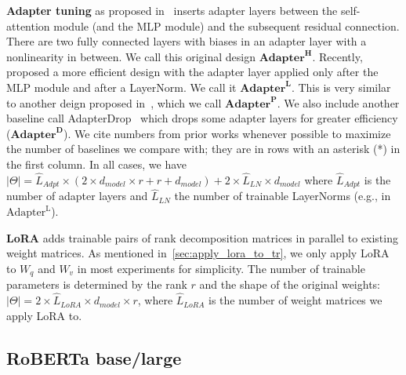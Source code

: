 \textbf{Adapter tuning} as proposed in~\citet{houlsby_parameter-efficient_2019} inserts adapter layers between the self-attention module (and the MLP module) and the subsequent residual connection. There are two fully connected layers with biases in an adapter layer with a nonlinearity in between. We call this original design $\textbf{Adapter}^{\textbf{H}}$.
Recently, \citet{lin-etal-2020-exploring} proposed a more efficient design with the adapter layer applied only after the MLP module and after a LayerNorm. We call it $\textbf{Adapter}^{\textbf{L}}$.
This is very similar to another deign proposed in~\citet{pfeiffer2021adapterfusion}, which we call $\textbf{Adapter}^{\textbf{P}}$.
We also include another baseline call AdapterDrop~\citep{ruckle2020adapterdrop} which drops some adapter layers for greater efficiency ($\textbf{Adapter}^{\textbf{D}}$).
We cite numbers from prior works whenever possible to maximize the number of baselines we compare with; they are in rows with an asterisk (*) in the first column. In all cases,  we have $|\Theta| = \hat{L}_{Adpt} \times (2 \times d_{model} \times r + r + d_{model}) + 2 \times \hat{L}_{LN} \times d_{model}$ where $\hat{L}_{Adpt}$ is the number of adapter layers and $\hat{L}_{LN}$ the number of trainable LayerNorms (e.g., in $\text{Adapter}^{\text{L}}$).

\textbf{LoRA} adds trainable pairs of rank decomposition matrices in parallel to existing weight matrices. As mentioned in~\autoref{sec:apply_lora_to_tr}, we only apply LoRA to $W_{q}$ and $W_{v}$ in most experiments for simplicity. The number of trainable parameters is determined by the rank $r$ and the shape of the original weights: $|\Theta| = 2 \times \hat{L}_{LoRA} \times d_{model} \times r$, where $\hat{L}_{LoRA}$ is the number of weight matrices we apply LoRA to.

\subsection{RoBERTa base/large}
\label{sec:bert_expt}

